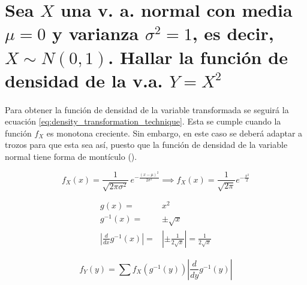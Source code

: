 \documentclass{article}
\begin{document}
	\maketitle
  \thispagestyle{empty}



	\section{Sea $X$ una v. a. normal con media $\mu = 0$ y varianza $\sigma^2 = 1$, es decir, $ X \sim N(0,1)$. Hallar la función de densidad de la v.a. $Y = X^2$}

    \paragraph{}
    Para obtener la función de densidad de la variable transformada se seguirá la ecuación \eqref{eq:density_transformation_technique}. Esta se cumple cuando la función $f_X$ es monotona creciente. Sin embargo, en este caso se deberá adaptar a trozos para que esta sea así, puesto que la función de densidad de la variable normal tiene forma de montículo ().


    \begin{equation}
      f_X(x) = {\displaystyle {\frac {1}{\sqrt {2\pi \sigma ^{2}}}}\,e^{-{\frac {(x-\mu )^{2}}{2\sigma ^{2}}}}} \implies f_X(x) = \frac{1}{\sqrt{2\pi} } e^{-\frac{x^2}{2}}
    \end{equation}


    \begin{align}
      g(x) =& x^2 \\
      g^{-1}(x) =& \pm \sqrt{x} \\
      \left| \frac{d}{dx} g^{-1} (x) \right| =& \left| \pm \frac{1}{2\sqrt{x}}  \right| = \frac{1}{2\sqrt{x}}
    \end{align}

    \begin{equation}
    \label{eq:density_transformation_technique}
      f_Y (y) = \sum f_X \left( g^{-1} (y) \right) \left| \frac{d}{dy} g^{-1} (y) \right|
    \end{equation}
\end{document}
